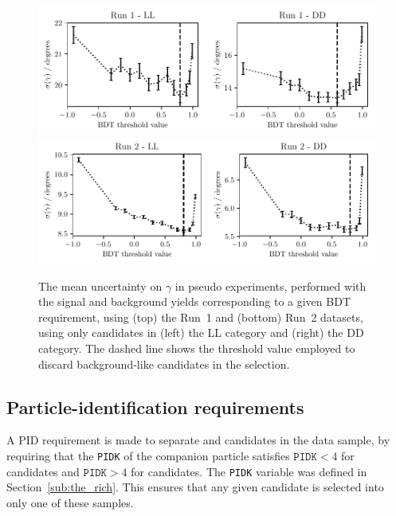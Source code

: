 \begin{figure}[tb]
    \centering
    \includegraphics[width=0.85\columnwidth]{figures/analysis/bdt_gamma_scan_Run1_thesis.pdf}
    \includegraphics[width=0.85\columnwidth]{figures/analysis/bdt_gamma_scan_Run2_thesis.pdf}
    \caption{The mean uncertainty on $\gamma$ in pseudo experiments, performed with the signal and background yields corresponding to a given BDT requirement, using (top) the Run~1 and (bottom) Run~2 datasets, using only candidates in (left) the LL category and (right) the DD category. The dashed line shows the threshold value employed to discard background-like candidates in the selection.}
    \label{fig:bdt_gamma_scan}
\end{figure}


\subsection{Particle-identification requirements} %
\label{sub:particle_identification_requirements}

A PID requirement is made to separate \BtoDK and \BtoDpi candidates in the data sample, by requiring that the \texttt{PIDK} of the companion particle satisfies $\texttt{PIDK} < 4$ for \BtoDpi candidates and $\texttt{PIDK} > 4$ for \BtoDK candidates. The \texttt{PIDK} variable was defined in Section~\ref{sub:the_rich}. This ensures that any given candidate is selected into only one of these samples.


